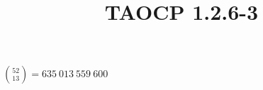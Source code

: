 \documentclass{article}
\title{TAOCP 1.2.6\mbox{-}3}
\begin{document}
\maketitle

\( \binom{52}{13} = 635\ 013\ 559\ 600 \)
\end{document}
